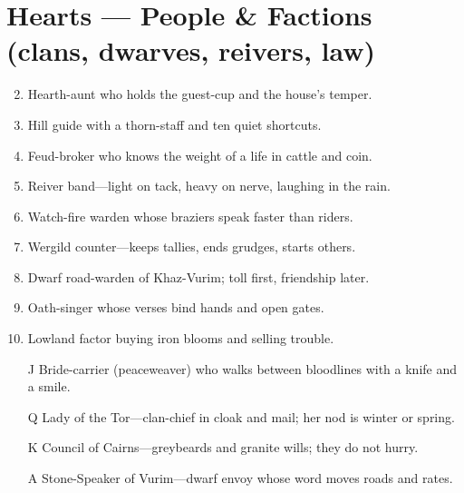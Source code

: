 \section*{Hearts --- People \& Factions (clans, dwarves, reivers, law)}
\label{sec:ubral-people}
\begin{enumerate}
\setcounter{enumi}{1}
\item Hearth-aunt who holds the guest-cup and the house's temper.
\item Hill guide with a thorn-staff and ten quiet shortcuts.
\item Feud-broker who knows the weight of a life in cattle and coin.
\item Reiver band---light on tack, heavy on nerve, laughing in the rain.
\item Watch-fire warden whose braziers speak faster than riders.
\item Wergild counter---keeps tallies, ends grudges, starts others.
\item Dwarf road-warden of Khaz-Vurim; toll first, friendship later.
\item Oath-singer whose verses bind hands and open gates.
\item Lowland factor buying iron blooms and selling trouble.
\item[J] Bride-carrier (peaceweaver) who walks between bloodlines with a knife and a smile.
\item[Q] Lady of the Tor---clan-chief in cloak and mail; her nod is winter or spring.
\item[K] Council of Cairns---greybeards and granite wills; they do not hurry.
\item[A] Stone-Speaker of Vurim---dwarf envoy whose word moves roads and rates.
\end{enumerate}

